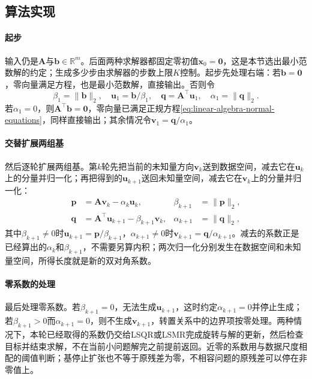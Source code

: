 \subsection{算法实现}

\paragraph{起步}
输入仍是$\bm A$与$\bm b\in\mathbb R^m$。后面两种求解器都固定零初值$\bm x_0=\bm0$，这是本节选出最小范数解的约定；生成多少步由求解器的步数上限$K$控制。起步先处理右端：若$\bm b=\bm0$，零向量满足方程，也是最小范数解，直接输出。否则令
\[
 \beta_1=\lVert\bm b\rVert_2,\quad \bm u_1=\bm b/\beta_1,\quad
 \bm q=\bm A^\top\bm u_1,\quad \alpha_1=\lVert\bm q\rVert_2 .
\]
若$\alpha_1=0$，则$\bm A^\top\bm b=\bm0$，零向量已满足正规方程\eqref{eq:linear-algebra-normal-equations}，同样直接输出；其余情况令$\bm v_1=\bm q/\alpha_1$。

\paragraph{交替扩展两组基}
然后逐轮扩展两组基。第$k$轮先把当前的未知量方向$\bm v_k$送到数据空间，减去它在$\bm u_k$上的分量并归一化；再把得到的$\bm u_{k+1}$送回未知量空间，减去它在$\bm v_k$上的分量并归一化：
\[
 \begin{aligned}
 \bm p&=\bm A\bm v_k-\alpha_k\bm u_k, & \beta_{k+1}&=\lVert\bm p\rVert_2,\\
 \bm q&=\bm A^\top\bm u_{k+1}-\beta_{k+1}\bm v_k, & \alpha_{k+1}&=\lVert\bm q\rVert_2,
 \end{aligned}
\]
其中$\beta_{k+1}\ne0$时$\bm u_{k+1}=\bm p/\beta_{k+1}$，$\alpha_{k+1}\ne0$时$\bm v_{k+1}=\bm q/\alpha_{k+1}$。减去的系数正是已经算出的$\alpha_k$和$\beta_{k+1}$，不需要另算内积；两次归一化分别发生在数据空间和未知量空间，所得长度就是新的双对角系数。

\paragraph{零系数的处理}
最后处理零系数。若$\beta_{k+1}=0$，无法生成$\bm u_{k+1}$，这时约定$\alpha_{k+1}=0$并停止生成；若$\beta_{k+1}>0$而$\alpha_{k+1}=0$，则不生成$\bm v_{k+1}$，转置关系中的边界项按零处理。两种情况下，本轮已经取得的系数仍交给LSQR或LSMR完成旋转与解的更新，然后检查目标并结束求解，不在当前小问题解完之前提前返回。近零的系数用与数据尺度相配的阈值判断；基停止扩张也不等于原残差为零，不相容问题的原残差可以停在非零值上。

